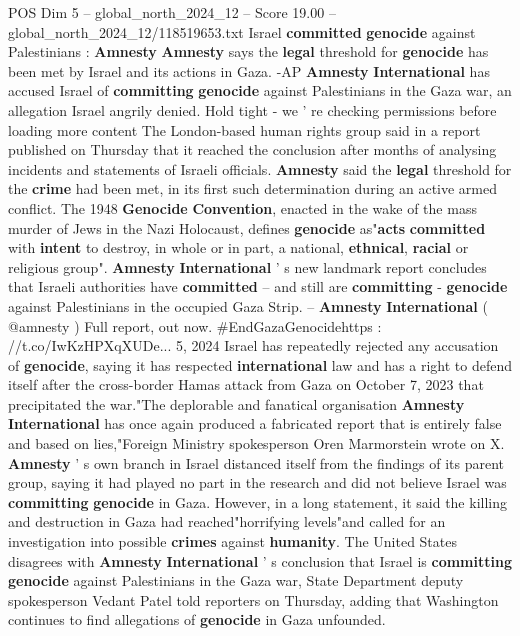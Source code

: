 \begin{textsample}{POS Dim 5 – global\_north\_2024\_12 – Score 19.00 – global\_north\_2024\_12/118519653.txt}  \label{ex:f5_pos_096}
Israel \textbf{committed} \textbf{genocide} against Palestinians : \textbf{Amnesty} \textbf{Amnesty} says the \textbf{legal} threshold for \textbf{genocide} has been met by Israel and its actions in Gaza. -AP \textbf{Amnesty} \textbf{International} has accused Israel of \textbf{committing} \textbf{genocide} against Palestinians in the Gaza war, an allegation Israel angrily denied.
Hold tight - we ' re checking permissions before loading more content The London-based human rights group said in a report published on Thursday that it reached the conclusion after months of analysing incidents and statements of Israeli officials. \textbf{Amnesty} said the \textbf{legal} threshold for the \textbf{crime} had been met, in its first such determination during an active armed conflict.
The 1948 \textbf{Genocide} \textbf{Convention}, enacted in the wake of the mass murder of Jews in the Nazi Holocaust, defines \textbf{genocide} as"\textbf{acts} \textbf{committed} with \textbf{intent} to destroy, in whole or in part, a national, \textbf{ethnical}, \textbf{racial} or religious group". \textbf{Amnesty} \textbf{International} ' s new landmark report concludes that Israeli authorities have \textbf{committed} -- and still are \textbf{committing} - \textbf{genocide} against Palestinians in the occupied Gaza Strip. -- \textbf{Amnesty} \textbf{International} ( @amnesty ) Full report, out now. \#EndGazaGenocidehttps : //t.co/IwKzHPXqXUDe... 5, 2024 Israel has repeatedly rejected any accusation of \textbf{genocide}, saying it has respected \textbf{international} law and has a right to defend itself after the cross-border Hamas attack from Gaza on October 7, 2023 that precipitated the war."The deplorable and fanatical organisation \textbf{Amnesty} \textbf{International} has once again produced a fabricated report that is entirely false and based on lies,"Foreign Ministry spokesperson Oren Marmorstein wrote on X. \textbf{Amnesty} ' s own branch in Israel distanced itself from the findings of its parent group, saying it had played no part in the research and did not believe Israel was \textbf{committing} \textbf{genocide} in Gaza.
However, in a long statement, it said the killing and destruction in Gaza had reached"horrifying levels"and called for an investigation into possible \textbf{crimes} against \textbf{humanity}.
The United States disagrees with \textbf{Amnesty} \textbf{International} ' s conclusion that Israel is \textbf{committing} \textbf{genocide} against Palestinians in the Gaza war, State Department deputy spokesperson Vedant Patel told reporters on Thursday, adding that Washington continues to find allegations of \textbf{genocide} in Gaza unfounded.

\end{textsample}

